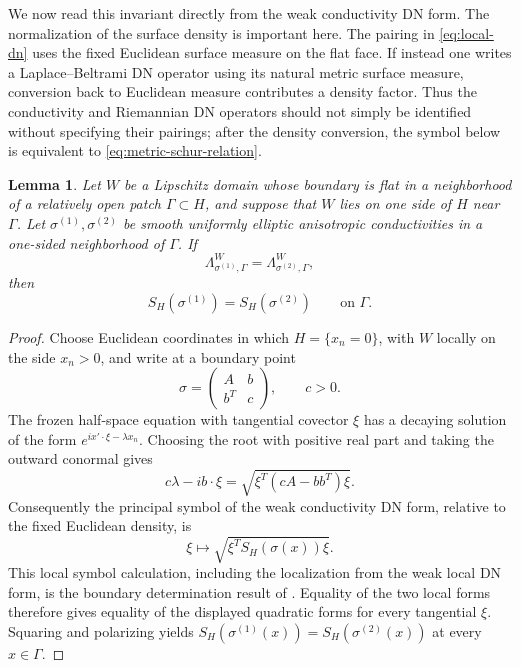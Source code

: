 \documentclass[11pt,oneside]{article}
\newtheorem{lemma}[theorem]{Lemma}
\newcommand{\DN}{\Lambda}
\begin{document}
We now read this invariant directly from the weak conductivity DN form.  The
normalization of the surface density is important here.  The pairing in
\eqref{eq:local-dn} uses the fixed Euclidean surface measure on the flat face.
If instead one writes a Laplace--Beltrami DN operator using its natural metric
surface measure, conversion back to Euclidean measure contributes a density
factor.  Thus the conductivity and Riemannian DN operators should not simply be
identified without specifying their pairings; after the density conversion,
the symbol below is equivalent to \eqref{eq:metric-schur-relation}.

\begin{lemma}
\label{lem:face-data-from-local-dn}
Let \(W\) be a Lipschitz domain whose boundary is flat in a neighborhood of a
relatively open patch \(\Gamma\subset H\), and suppose that \(W\) lies on one
side of \(H\) near \(\Gamma\).  Let \(\sigma^{(1)},\sigma^{(2)}\) be smooth
uniformly elliptic anisotropic conductivities in a one-sided neighborhood of
\(\Gamma\).  If
\begin{equation}
  \DN^W_{\sigma^{(1)},\Gamma}=\DN^W_{\sigma^{(2)},\Gamma},
\end{equation}
then
\begin{equation}
  S_H(\sigma^{(1)})=S_H(\sigma^{(2)})
  \qquad\text{on }\Gamma .
  \label{eq:face-data-from-local-dn}
\end{equation}
\end{lemma}

\begin{proof}
Choose Euclidean coordinates in which \(H=\{x_n=0\}\), with \(W\) locally on
the side \(x_n>0\), and write at a boundary point
\begin{equation}
  \sigma=
  \begin{pmatrix}
    A&b\\ b^T&c
  \end{pmatrix},
  \qquad c>0.
\end{equation}
The frozen half-space equation with tangential covector \(\xi\) has a decaying
solution of the form
\(e^{ix'\cdot\xi-\lambda x_n}\).  Choosing the root with positive real part and
taking the outward conormal gives
\begin{equation}
  c\lambda-i b\cdot\xi
  =\sqrt{\xi^T(cA-bb^T)\xi}.
  \label{eq:weak-dn-principal-symbol}
\end{equation}
Consequently the principal symbol of the weak conductivity DN form, relative
to the fixed Euclidean density, is
\begin{equation}
  \xi\longmapsto\sqrt{\xi^T S_H(\sigma(x))\xi}.
\end{equation}
This local symbol calculation, including the localization from the weak local
DN form, is the boundary determination result of \cite{KangYun2003}.  Equality
of the two local forms therefore gives equality of the displayed quadratic
forms for every tangential \(\xi\).  Squaring and polarizing yields
\(S_H(\sigma^{(1)}(x))=S_H(\sigma^{(2)}(x))\) at every \(x\in\Gamma\).
\end{proof}
\end{document}
